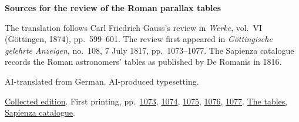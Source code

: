 \clearpage\thispagestyle{empty}
\begin{center}\Large\bfseries Sources for the review of the Roman parallax tables\end{center}

The translation follows Carl Friedrich Gauss’s review in \emph{Werke}, vol.~VI (Göttingen, 1874), pp.~599--601. The review first appeared in \emph{Göttingische gelehrte Anzeigen}, no.~108, 7 July 1817, pp.~1073--1077. The Sapienza catalogue records the Roman astronomers’ tables as published by De Romanis in 1816.

AI-translated from German. AI-produced typesetting.

\href{https://gdz.sub.uni-goettingen.de/id/PPN236007467}{Collected edition}. First printing, pp.~\href{https://images.p.sub.uni-goettingen.de/iiif/image/gdz:PPN319721507_1817:00001085/full/1650,/0/default.jpg}{1073}, \href{https://images.p.sub.uni-goettingen.de/iiif/image/gdz:PPN319721507_1817:00001086/full/1650,/0/default.jpg}{1074}, \href{https://images.p.sub.uni-goettingen.de/iiif/image/gdz:PPN319721507_1817:00001087/full/1650,/0/default.jpg}{1075}, \href{https://images.p.sub.uni-goettingen.de/iiif/image/gdz:PPN319721507_1817:00001088/full/1650,/0/default.jpg}{1076}, \href{https://images.p.sub.uni-goettingen.de/iiif/image/gdz:PPN319721507_1817:00001089/full/1650,/0/default.jpg}{1077}. \href{https://sapienzadigitallibrary.uniroma1.it/DigitalResource/itrousr-DigitalResource_RMSIC_00024432}{The tables, Sapienza catalogue}.

\clearpage
